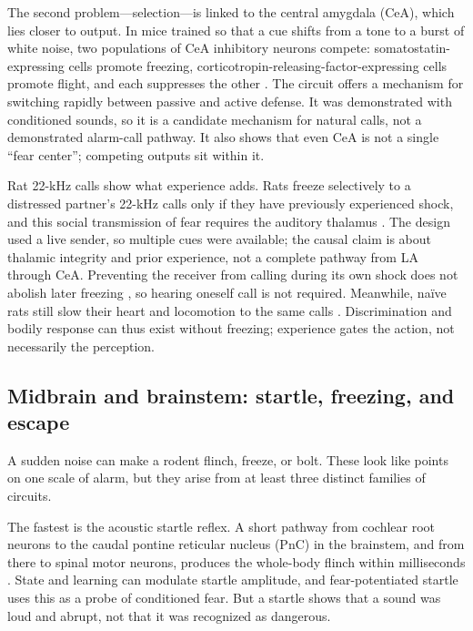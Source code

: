 The second problem---selection---is linked to the central amygdala (CeA), which lies closer to output. In mice trained so that a cue shifts from a tone to a burst of white noise, two populations of CeA inhibitory neurons compete: somatostatin-expressing cells promote freezing, corticotropin-releasing-factor-expressing cells promote flight, and each suppresses the other \citep{FadokEtAl2017}. The circuit offers a mechanism for switching rapidly between passive and active defense. It was demonstrated with conditioned sounds, so it is a candidate mechanism for natural calls, not a demonstrated alarm-call pathway. It also shows that even CeA is not a single ``fear center''; competing outputs sit within it.

Rat 22-kHz calls show what experience adds. Rats freeze selectively to a distressed partner's 22-kHz calls only if they have previously experienced shock, and this social transmission of fear requires the auditory thalamus \citep{KimEtAl2010}. The design used a live sender, so multiple cues were available; the causal claim is about thalamic integrity and prior experience, not a complete pathway from LA through CeA. Preventing the receiver from calling during its own shock does not abolish later freezing \citep{CalubEtAl2018}, so hearing oneself call is not required. Meanwhile, naïve rats still slow their heart and locomotion to the same calls \citep{OlszynskiEtAl2020}. Discrimination and bodily response can thus exist without freezing; experience gates the action, not necessarily the perception.

\subsection{Midbrain and brainstem: startle, freezing, and escape}
\label{sec:mechanisms-midbrain}

A sudden noise can make a rodent flinch, freeze, or bolt. These look like points on one scale of alarm, but they arise from at least three distinct families of circuits.

The fastest is the acoustic startle reflex. A short pathway from cochlear root neurons to the caudal pontine reticular nucleus (PnC) in the brainstem, and from there to spinal motor neurons, produces the whole-body flinch within milliseconds \citep{DavisEtAl1982,LeeEtAl1996}. State and learning can modulate startle amplitude, and fear-potentiated startle uses this as a probe of conditioned fear. But a startle shows that a sound was loud and abrupt, not that it was recognized as dangerous.

